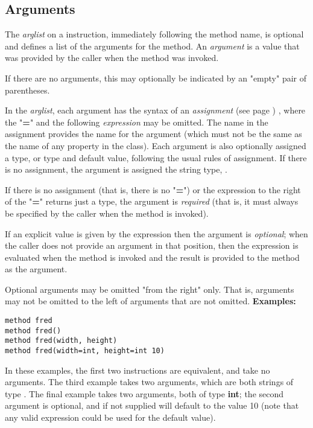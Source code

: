 \subsection{Arguments}
 
The \emph{arglist} on a  instruction, immediately
following the method name, is optional and defines a list of the
arguments for the method.  An \emph{argument} is a value that was
provided by the caller when the method was invoked.
 
If there are no arguments, this may optionally be indicated by an
"empty" pair of parentheses.
 
In the \emph{arglist}, each argument has the syntax of an
 \emph{assignment} (see page \pageref{refassign}) , where the "\textbf{=}"
and the following \emph{expression} may be omitted.
The name in the assignment provides the name for the argument (which
must not be the same as the name of any property in the class).
Each argument is also optionally assigned a type, or type and default
value, following the usual rules of assignment.
If there is no assignment, the argument is assigned the \nr{} string
type, .
 
If there is no assignment (that is, there is no "\textbf{=}") or
the expression to the right of the "\textbf{=}" returns just a
type, the argument is \emph{required} (that is, it must always be
specified by the caller when the method is invoked).
 
If an explicit value is given by the expression then the argument is
\emph{optional}; when the caller does not provide an argument in that
position, then the expression is evaluated when the method is invoked
and the result is provided to the method as the argument.
 
Optional arguments may be omitted "from the right" only.
That is, arguments may not be omitted to the left of arguments that are
not omitted.
 \textbf{Examples:}
\begin{lstlisting}
method fred
method fred()
method fred(width, height)
method fred(width=int, height=int 10)
\end{lstlisting}
In these examples, the first two  instructions are
equivalent, and take no arguments.
The third example takes two arguments, which are both strings
of type .
The final example takes two arguments, both of type \textbf{int}; the
second argument is optional, and if not supplied will default to the
value 10 (note that any valid expression could be used for the default
value).

